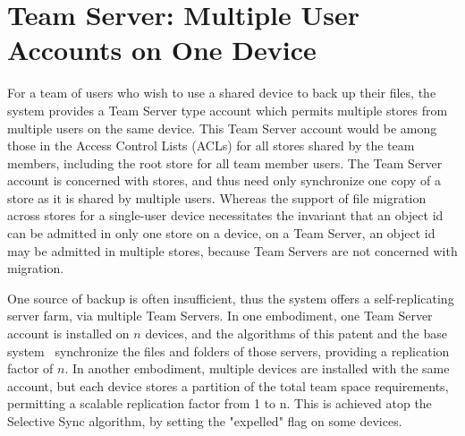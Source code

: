 \section*{Team Server: Multiple User Accounts on One Device}

For a team of users who wish to use a shared device to back up their files,
the system provides a Team Server type account which permits multiple stores
from multiple users on the same device. This Team Server account would be
among those in the Access Control Lists (ACLs) for all stores shared by the team
members, including the root store for all team member users. The Team Server
account is concerned with stores, and thus need only synchronize one copy of a
store as it is shared by multiple users. Whereas the support of file migration
across stores for a single-user device necessitates the invariant that an object
id can be admitted in only one store on a device, on a Team Server, an object id
may be admitted in multiple stores, because Team Servers are not concerned with
migration.

One source of backup is often insufficient, thus the system offers a
self-replicating server farm, via multiple Team Servers. In one embodiment,
one Team Server account is installed on $n$ devices, and the algorithms of this
patent and the base system~\cite{wang:patent2012} synchronize the files and
folders of those servers, providing a replication factor of $n$. In another
embodiment, multiple devices are installed with the same account, but each
device stores a partition of the total team space requirements, permitting a
scalable replication factor from 1 to n. This is achieved atop the Selective
Sync algorithm, by setting the "expelled" flag on some devices.
